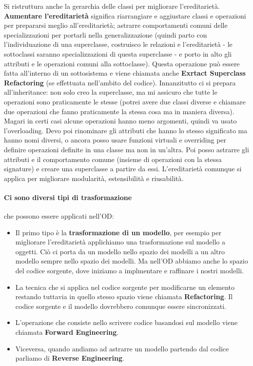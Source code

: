         Si ristruttura anche la gerarchia delle classi per migliorare l'ereditarietà. \textbf{Aumentare l'ereditarietà} significa riarrangiare e aggiustare classi e operazioni per prepararsi meglio all'ereditarietà; astrarre comportamenti comuni delle specializzazioni per portarli nella generalizzazione (quindi parto con l'individuazione di una superclasse, costruisco le relazioni e l'ereditarietà - le sottoclassi saranno specializzazioni di questa superclasse - e porto in alto gli attributi e le operazioni comuni alla sottoclasse). Questa operazione può essere fatta all'interno di un sottosistema e viene chiamata anche \textbf{Exrtact Superclass Refactoring} (se effettuata nell'ambito del codice). Innanzitutto ci si prepara all'inheritance: non solo creo la superclasse, ma mi assicuro che tutte le operazioni sono praticamente le stesse (potrei avere due classi diverse e chiamare due operazioni che fanno praticamente la stessa cosa ma in maniera diversa). Magari in certi casi alcune operazioni hanno meno argomenti, quindi va usato l'overloading. Devo poi rinominare gli attributi che hanno lo stesso significato ma hanno nomi diversi, o ancora posso usare funzioni virtuali e overriding per definire operazioni definite in una classe ma non in un'altra. Poi posso astrarre gli attributi e il comportamento comune (insieme di operazioni con la stessa signature) e creare una superclasse a partire da essi. L'ereditarietà comunque si applica per migliorare modularità, estensibilità e riusabilità.
        
        \paragraph{Ci sono diversi tipi di trasformazione} che possono essere applicati nell'OD:
        \begin{itemize}
            \item Il primo tipo è la \textbf{trasformazione di un modello}, per esempio per migliorare l'ereditarietà applichiamo una trasformazione sul modello a oggetti. Ciò ci porta da un modello nello spazio dei modelli a un altro modello sempre nello spazio dei modelli. Ma nell'OD abbiamo anche lo spazio del codice sorgente, dove iniziamo a implmentare e raffinare i nostri modelli.
            \item La tecnica che si applica nel codice sorgente per modificarne un elemento restando tuttavia in quello stesso spazio viene chiamata \textbf{Refactoring}. Il codice sorgente e il modello dovrebbero comunque essere sincronizzati.
            \item L'operazione che consiste nello scrivere codice basandosi sul modello viene chiamata \textbf{Forward Engineering}.
            \item Viceversa, quando andiamo ad astrarre un modello partendo dal codice parliamo di \textbf{Reverse Engineering}.
        \end{itemize}
        

